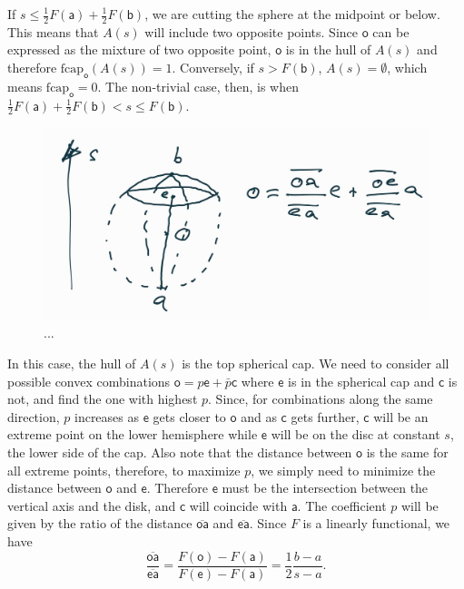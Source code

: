 \documentclass[10pt,twocolumn, nofootinbib]{revtex4-2}
\newcommand\frcap{\mathrm{fcap}}
\newcommand{\ens}[1][e] {\mathsf{#1}} %
\begin{document}
If $s\leq \frac{1}{2} F(\ens[a]) + \frac{1}{2} F(\ens[b])$, we are cutting the sphere at the midpoint or below. This means that $A(s)$ will include two opposite points. Since $\ens[o]$ can be expressed as the mixture of two opposite point, $\ens[o]$ is in the hull of $A(s)$ and therefore $\frcap_{\ens[o]}(A(s)) = 1$. Conversely, if $s > F(\ens[b])$, $A(s) = \emptyset$, which means $\frcap_{\ens[o]} = 0$. The non-trivial case, then, is when $\frac{1}{2} F(\ens[a]) + \frac{1}{2} F(\ens[b]) < s \leq F(\ens[b])$.

\begin{figure}[H]
	\centering
	\includegraphics[width=0.8\columnwidth]{ChoquetCalculation2.jpg}
	\caption{...}
\end{figure}

In this case, the hull of $A(s)$ is the top spherical cap. We need to consider all possible convex combinations $\ens[o] = p \ens + \bar{p} \ens[c]$ where $\ens$ is in the spherical cap and $\ens[c]$ is not, and find the one with highest $p$. Since, for combinations along the same direction, $p$ increases as $\ens$ gets closer to $\ens[o]$ and as $\ens[c]$ gets further, $\ens[c]$ will be an extreme point on the lower hemisphere while $\ens$ will be on the disc at constant $s$, the lower side of the cap. Also note that the distance between $\ens[o]$ is the same for all extreme points, therefore, to maximize $p$, we simply need to minimize the distance between $\ens[o]$ and $\ens$. Therefore $\ens$ must be the intersection between the vertical axis and the disk, and $\ens[c]$ will coincide with $\ens[a]$. The coefficient $p$ will be given by the ratio of the distance $\overline{\ens[o]\ens[a]}$ and $\overline{\ens\ens[a]}$. Since $F$ is a linearly functional, we have
\begin{equation}
	\frac{\overline{\ens[o]\ens[a]}}{\overline{\ens\ens[a]}} = \frac{F(\ens[o])-F(\ens[a])}{F(\ens) - F(\ens[a])} = \frac{1}{2} \frac{b - a}{s-a}.
\end{equation}
\end{document}
